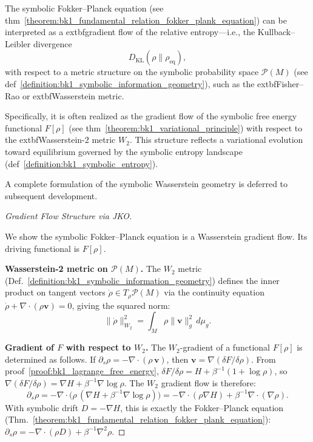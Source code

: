 \begin{theorem}
\label{theorem:bk1_the_fokker_planck_equation_theorem}
The symbolic Fokker–Planck equation (see thm~\ref{theorem:bk1_fundamental_relation_fokker_plank_equation}) can be interpreted as a 	extbf{gradient flow} of the relative entropy—i.e., the Kullback–Leibler divergence
\[
D_{\mathrm{KL}}(\rho \| \rho_{\text{eq}}),
\]
with respect to a metric structure on the symbolic probability space $\mathcal{P}(M)$ (see def~\ref{definition:bk1_symbolic_information_geometry}), such as the 	extbf{Fisher–Rao} or 	extbf{Wasserstein} metric.

Specifically, it is often realized as the gradient flow of the symbolic free energy functional $F[\rho]$ (see thm~\ref{theorem:bk1_variational_principle}) with respect to the 	extbf{Wasserstein-2 metric} $W_2$. This structure reflects a variational evolution toward equilibrium governed by the symbolic entropy landscape (def~\ref{definition:bk1_symbolic_entropy}).

A complete formulation of the symbolic Wasserstein geometry is deferred to subsequent development.
\begin{proof}[Gradient Flow Structure via JKO]
\label{proof:bk1_sketch_gradient_flow_thermodynamics}
\leavevmode

We show the symbolic Fokker--Planck equation is a Wasserstein gradient flow.
Its driving functional is $F[\rho]$.

\textbf{Wasserstein-2 metric on $\mathcal{P}(M)$.}
The $W_2$ metric (Def.~\ref{definition:bk1_symbolic_information_geometry})
defines the inner product on tangent vectors
$\dot\rho \in T_\rho\mathcal{P}(M)$ via the continuity equation
$\dot\rho + \nabla\cdot(\rho\mathbf{v})=0$, giving the squared norm:
\[
\|\dot\rho\|_{W_2}^2 = \int_M \rho\|\mathbf{v}\|_g^2\,d\mu_g.
\]

\textbf{Gradient of $F$ with respect to $W_2$.}
The $W_2$-gradient of a functional $F[\rho]$ is determined as follows.
If $\partial_s\rho = -\nabla\cdot(\rho\,\mathbf{v})$, then
$\mathbf{v} = \nabla(\delta F/\delta\rho)$.
From proof~\ref{proof:bk1_lagrange_free_energy},
$\delta F/\delta\rho = H + \beta^{-1}(1+\log\rho)$, so
$\nabla(\delta F/\delta\rho) = \nabla H + \beta^{-1}\nabla\log\rho$.
The $W_2$ gradient flow is therefore:
\[
\partial_s\rho
= -\nabla\cdot\!\bigl(\rho\,(\nabla H + \beta^{-1}\nabla\log\rho)\bigr)
= -\nabla\cdot(\rho\nabla H) + \beta^{-1}\nabla\cdot(\nabla\rho).
\]
With symbolic drift $D = -\nabla H$, this is exactly the Fokker--Planck equation
(Thm.~\ref{theorem:bk1_fundamental_relation_fokker_plank_equation}):
$\partial_s\rho = -\nabla\cdot(\rho D) + \beta^{-1}\nabla^2\rho$.


\end{proof}
\end{theorem}
